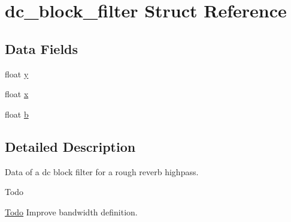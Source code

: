 \hypertarget{structdc__block__filter}{\section{dc\-\_\-block\-\_\-filter Struct Reference}
\label{structdc__block__filter}
}
\subsection*{Data Fields}
\begin{DoxyCompactItemize}
\item 
float \hyperlink{structdc__block__filter_ac47f2dcae35a1948fb7280f8b9fb34cd}{y}
\item 
float \hyperlink{structdc__block__filter_a51740a56346e009262b43b57937412af}{x}
\item 
float \hyperlink{structdc__block__filter_a368d9cdea5bf60962e415f9958d0c296}{b}
\end{DoxyCompactItemize}


\subsection{Detailed Description}
Data of a dc block filter for a rough reverb highpass. \begin{DoxyRefDesc}{Todo}
\item[\hyperlink{todo__todo000017}{Todo}]Improve bandwidth definition. \end{DoxyRefDesc}


